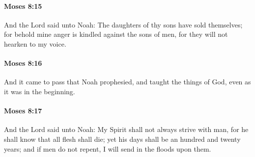 		\paragraph{Moses 8:15} %
			\label{MOSES-8-15}

			And the Lord said unto Noah: The daughters of thy sons have sold themselves; for behold mine anger is kindled against the sons of men, for they will not hearken to my voice.


		\paragraph{Moses 8:16} %
			\label{MOSES-8-16}

			And it came to pass that Noah prophesied, and taught the things of God, even as it was in the beginning.


		\paragraph{Moses 8:17} %
			\label{MOSES-8-17}

			And the Lord said unto Noah: My Spirit shall not always strive with man, for he shall know that all flesh shall die; yet his days shall be an hundred and twenty years; and if men do not repent, I will send in the floods upon them.


